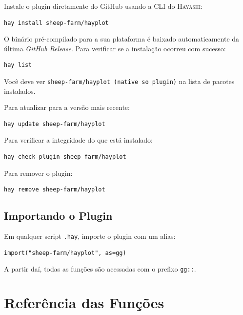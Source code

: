 \documentclass[12pt, a4paper, oneside]{book}
\newcommand{\code}[1]{\texttt{#1}}
\newcommand{\hayashi}{\textsc{Hayashi}}
\begin{document}
Instale o plugin diretamente do GitHub usando a CLI do \hayashi{}:

\begin{lstlisting}[style=inline, caption={Instalação via CLI}]
hay install sheep-farm/hayplot
\end{lstlisting}

O binário pré-compilado para a sua plataforma é baixado automaticamente
da última \textit{GitHub Release}. Para verificar se a instalação ocorreu com sucesso:

\begin{lstlisting}[style=inline, caption={Verificação da instalação}]
hay list
\end{lstlisting}

Você deve ver \code{sheep-farm/hayplot (native so plugin)} na lista de pacotes
instalados.

Para atualizar para a versão mais recente:

\begin{lstlisting}[style=inline, caption={Atualização}]
hay update sheep-farm/hayplot
\end{lstlisting}

Para verificar a integridade do que está instalado:

\begin{lstlisting}[style=inline, caption={Verificação de integridade}]
hay check-plugin sheep-farm/hayplot
\end{lstlisting}

Para remover o plugin:

\begin{lstlisting}[style=inline, caption={Remoção}]
hay remove sheep-farm/hayplot
\end{lstlisting}

\section{Importando o Plugin}

Em qualquer script \code{.hay}, importe o plugin com um alias:

\begin{lstlisting}[caption={Importação com alias}]
import("sheep-farm/hayplot", as=gg)
\end{lstlisting}

A partir daí, todas as funções são acessadas com o prefixo \code{gg::}.

\chapter{Referência das Funções}
\end{document}
